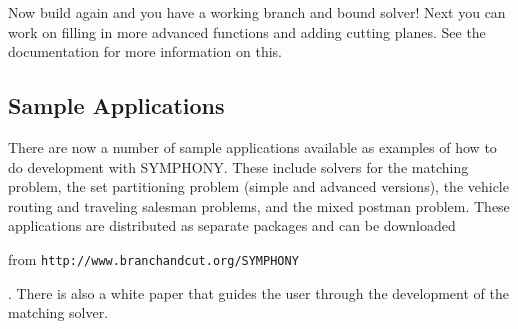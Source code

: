 Now build again and you have a working branch and bound solver! Next you can
work on filling in more advanced functions and adding cutting planes. See the
documentation for more information on this.

\subsection{Sample Applications}

There are now a number of sample applications available as examples of how
to do development with SYMPHONY. These include solvers for the matching
problem, the set partitioning problem (simple and advanced versions), the 
vehicle routing and traveling salesman problems, and the mixed postman
problem. These applications are distributed as separate packages and can be
downloaded 	      
\emph{}
\begin{latexonly} 
from \texttt{http://www.branchandcut.org/SYMPHONY}
\end{latexonly}. There is also a white paper that guides the
user through the development of the matching solver.
